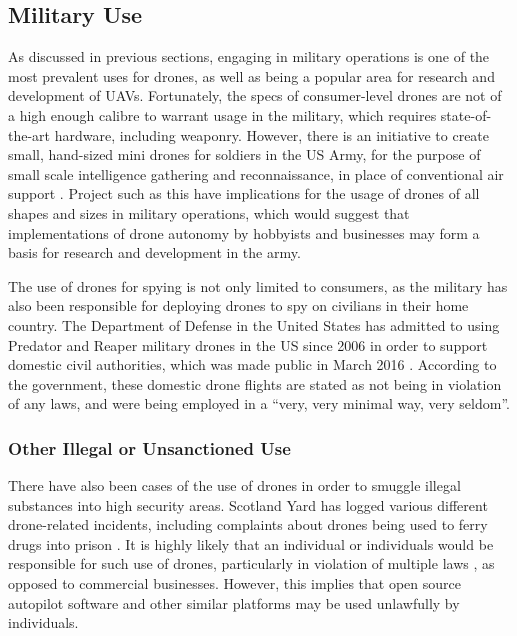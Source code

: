 \subsection{Military Use}
As discussed in previous sections, engaging in military operations is one of the most prevalent uses for drones, as well as being a popular area for research and development of UAVs. Fortunately, the specs of consumer-level drones are not of a high enough calibre to warrant usage in the military, which requires state-of-the-art hardware, including weaponry. However, there is an initiative to create small, hand-sized mini drones for soldiers in the US Army, for the purpose of small scale intelligence gathering and reconnaissance, in place of conventional air support \cite{jonfingas2016}. Project such as this have implications for the usage of drones of all shapes and sizes in military operations, which would suggest that implementations of drone autonomy by hobbyists and businesses may form a basis for research and development in the army.

The use of drones for spying is not only limited to consumers, as the military has also been responsible for deploying drones to spy on civilians in their home country. The Department of Defense in the United States has admitted to using Predator and Reaper military drones in the US since 2006 in order to support domestic civil authorities, which was made public in March 2016 \cite{pentagon2016}. According to the government, these domestic drone flights are stated as not being in violation of any laws, and were being employed in a “very, very minimal way, very seldom”.

\subsubsection{Other Illegal or Unsanctioned Use}
There have also been cases of the use of drones in order to smuggle illegal substances into high security areas. Scotland Yard has logged various different drone-related incidents, including complaints about drones being used to ferry drugs into prison \cite{maryannrusson2015}.  It is highly likely that an individual or individuals would be responsible for such use of drones, particularly in violation of multiple laws \cite{civilaviationauthority2015}, as opposed to commercial businesses. However, this implies that open source autopilot software and other similar platforms may be used unlawfully by individuals.
